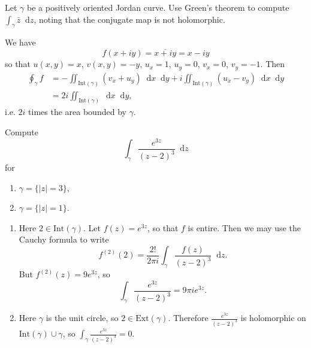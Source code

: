 \documentclass{article}
\newcommand\dif{\mathop{}\!\mathrm{d}}
\newcounter{Problem}
\newenvironment{Problem}{\begin{Exercise}[name={Problem},
                                          counter={Problem}]}
                        {\end{Exercise}}
\begin{document}
\begin{Problem}
Let $\gamma$ be a positively oriented Jordan curve. Use
Green's theorem to compute $\int_\gamma \bar{z} \dif z$,
noting that the conjugate map is not holomorphic.
\end{Problem}

\begin{Answer}
We have
$$
f(x + i y) = \overline{x + iy} = x - iy
$$
so that $u(x, y) = x$, $v(x, y) = -y$,
$u_x = 1$, $u_y = 0$, $v_x = 0$, $v_y = -1$. Then
\begin{align*}
\oint_\gamma f
&=
-
\iint_{\mathrm{Int}(\gamma)}
 (v_x + u_y) \dif x \dif y
+ i
\iint_{\mathrm{Int}(\gamma)}
  (u_x - v_y) \dif x \dif y \\
&=
2i
\iint_{\mathrm{Int}(\gamma)} \dif x \dif y,
\end{align*}
i.e. $2i$ times the area bounded by $\gamma$.
\end{Answer}

\begin{Problem}
Compute
$$
\int_\gamma \frac{e^{3z}}{(z - 2)^3} \dif z
$$
for
\begin{enumerate}[label=(\alph*)]
  \item{
    $\gamma = \{ |z| = 3 \}$,
  }
  \item{
    $\gamma = \{ |z| = 1 \}$.
  }
\end{enumerate}
\end{Problem}

\begin{Answer}
\begin{enumerate}[label=(\alph*)]
  \item{
    Here $2 \in \mathrm{Int}(\gamma)$. Let $f(z) = e^{3z}$,
    so that $f$ is entire. Then we may use the Cauchy formula to write
    $$
    f^{(2)}(2)
    =
    \frac{2!}{2 \pi i}
    \int_{\gamma}
      \frac{f(z)}{(z - 2)^3}
      \dif z.
    $$
    But $f^{(2)}(z) = 9 e^{3z}$, so
    $$
    \int_{\gamma}
      \frac{e^{3z}}{(z - 2)^3}
    = 9 \pi i e^{3z}.
    $$
  }
  \item{
    Here $\gamma$ is the unit circle, so $2 \in \mathrm{Ext}(\gamma)$. Therefore
    $\frac{e^{3z}}{(z - 2)^3}$ is holomorphic on $\mathrm{Int}(\gamma) \cup \gamma$,
    so $\int_\gamma \frac{e^{3z}}{(z-2)^3} = 0$.
  }
\end{enumerate}
\end{Answer}
\end{document}
